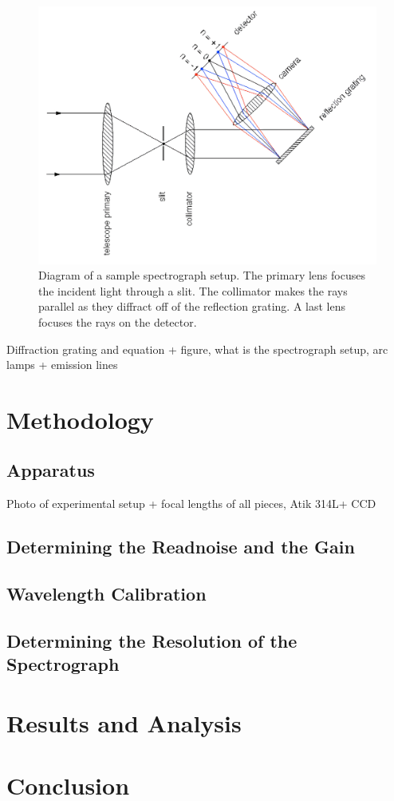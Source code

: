 \documentclass[a4paper,12pt,twocolumn]{article}
\begin{document}
		\begin{figure}
			\includegraphics[width=\columnwidth]{spectrograph_refl-transformed.png}
			\captionsetup{font=scriptsize}
			\caption{Diagram of a sample spectrograph setup. The primary lens focuses the incident light through a slit. The collimator makes the rays parallel as they diffract off of the reflection grating. A last lens focuses the rays on the detector.}
			\label{fig:spectrograph}
		\end{figure}
	
		Diffraction grating and equation + figure, what is the spectrograph setup, arc lamps + emission lines
	
	\section{Methodology}
		\subsection{Apparatus}
			Photo of experimental setup + focal lengths of all pieces, Atik 314L+ CCD
	
		\subsection{Determining the Readnoise and the Gain}
		
		\subsection{Wavelength Calibration}
	
		\subsection{Determining the Resolution of the Spectrograph}
	
	\section{Results and Analysis}
	
	\section{Conclusion}
	
	\printbibliography
\end{document}
